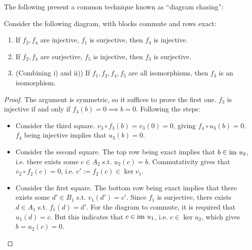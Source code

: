 The following present a common technique known as ``diagram chasing'':

\begin{proposition}
    Consider the following diagram, with blocks commute and rows exact:
    \begin{figure}[htbp]
        \centering
    \end{figure}
    \begin{enumerate}
        \item If $f_2, f_4$ are injective, $f_1$ is surjective, then $f_3$ is injective.
        \item If $f_2, f_4$ are surjective, $f_5$ is injective, then $f_3$ is surjective.
        \item (Combining i) and ii)) If $f_1, f_2, f_4, f_5$ are all isomorphisms, then $f_3$ is an isomorphism.
    \end{enumerate}
\end{proposition}

\begin{proof}
    The argument is symmetric, so it suffices to prove the first one. $f_3$ is injective if and only if $f_3(b) = 0 \implies b = 0$. Following the steps:
    \begin{itemize}
        \item Consider the third square. $v_3 \circ f_3(b) = v_3(0) = 0$, giving $f_4 \circ u_3(b) = 0$. $f_4$ being injective implies that $u_3(b) = 0$. 
        \item Consider the second square. The top row being exact implies that $b \in \mathrm{im}\  u_2$, i.e. there exists some $c \in A_2$ s.t. $u_2(c) = b$. Commutativity gives that $v_2 \circ f_2(c) = 0$, i.e. $c' := f_2(c) \in \ker v_1$.
        \item Consider the first square. The bottom row being exact implies that there exists some $d' \in B_1$ s.t. $v_1(d') = c'$. Since $f_1$ is surjective, there exists $d \in A_1$ s.t. $f_1(d) = d'$. For the diagram to commute, it is required that $u_1(d) = c$. But this indicates that $c \in \mathrm{im}\  u_1$, i.e. $c \in \ker u_2$, which gives $b = u_2(c) = 0$.
    \end{itemize}
\end{proof}

